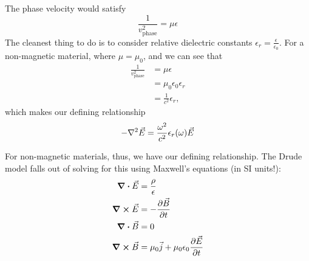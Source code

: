 \documentclass[../main.tex]{subfiles}
\begin{document}
	The phase velocity would satisfy
	\begin{equation}
		\frac{1}{v_{\textrm{phase}}^2} = \mu \epsilon
	\end{equation}
	The cleanest thing to do is to consider relative dielectric constants $\epsilon_r = \frac{\epsilon}{\epsilon_0}$.
	For a non-magnetic material, where $\mu = \mu_0$, and we can see that
	\begin{align}
		\frac{1}{v_{\textrm{phase}}^2} &= \mu \epsilon \\
		&= \mu_0 \epsilon_0 \epsilon_r \\
		&= \frac{1}{c^2} \epsilon_r,
	\end{align}
	which makes our defining relationship
	\begin{equation} \label{eq:DrudeTheory:DielectricDef}
	-\laplacian{\vec{E}} = \frac{\omega^2}{c^2} \epsilon_r(\omega) \vec{E}
	\end{equation}

	For non-magnetic materials, thus, we have our defining relationship.
	The Drude model falls out of solving for this using Maxwell's equations (in SI units!):
	\begin{align}
		\div{\vec{E}} &= \frac{\rho}{\epsilon} \\
		\curl{\vec{E}} &= - \pdv{\vec{B}}{t} \\
		\div{\vec{B}} &= 0 \\
		\curl{\vec{B}} &= \mu_0 \vec{j} + \mu_0 \epsilon_0 \pdv{\vec{E}}{t}
	\end{align}
\end{document}
